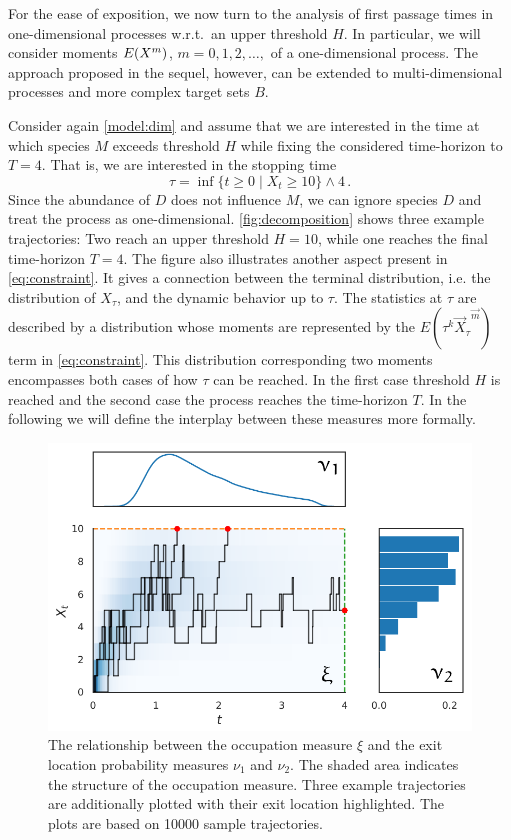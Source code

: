 For the ease of exposition, we now turn to the analysis of first passage times in
one-dimensional processes w.r.t.\ an upper threshold $H$. In particular,
we will consider  moments ${E}(X^m)$, $m=0,1,2,\dots,$ of a one-dimensional process.
The   approach proposed in the sequel, however,
can be extended to multi-dimensional processes and more complex target sets $B$.

\begin{example}
	Consider again \autoref{model:dim} and assume that we are interested in the
time at which species $M$ exceeds  threshold $H$ while fixing the considered time-horizon to
$T=4$. That is, we are interested in the stopping time
\[
	\tau=\inf\{t\geq 0\mid X_t\geq 10\}\land 4\,.
\]
Since the abundance of $D$ does not influence $M$, we can ignore
species $D$ and treat the process as one-dimensional.
\autoref{fig:decomposition} shows three example trajectories:
Two reach an upper threshold $H=10$, while one reaches the final time-horizon $T=4$.
The figure also illustrates another aspect present in \eqref{eq:constraint}.
It gives a connection between the terminal distribution, i.e. the distribution of $X_{\tau}$,
and the dynamic behavior up to $\tau$.
The statistics at $\tau$ are described by a distribution whose %
moments are represented by the $E(\tau^k{\vec{X}_{\tau}}^{\vec{m}})$ term in \eqref{eq:constraint}.
This distribution corresponding two moments encompasses both cases of how
$\tau$ can be reached. In the first case threshold $H$ is reached and the second case the process reaches the time-horizon $T$.
In the following we will define the interplay between these measures more formally.
\begin{figure}[htb]
    \centering
    \includegraphics[scale=.8]{gfx/decomp1.pdf}
	\caption[Occupation measure $\xi$ and
	exit location probability measures $\nu_1$ and $\nu_2$]{The relationship between the occupation measure $\xi$ and the
    exit location probability measures $\nu_1$ and $\nu_2$. The shaded area indicates
    the structure of the occupation measure. Three example trajectories are
    additionally plotted with
	their exit location highlighted. The plots are based on \num{10000} sample trajectories.}
    \label{fig:decomposition}
\end{figure}
\end{example}


